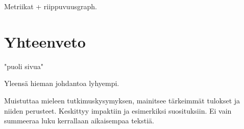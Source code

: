 \documentclass[finnish]{tktltiki2}
\theoremstyle{definition}
\theoremstyle{remark}
\begin{document}
Metriikat + riippuvuusgraph.

\section{Yhteenveto}
"puoli sivua"

Yleensä hieman johdantoa lyhyempi.

Muistuttaa mieleen tutkimuskysymyksen, mainitsee tärkeimmät tulokset ja niiden perusteet. Keskittyy impaktiin ja esimerkiksi suosituksiin. Ei vain summeeraa luku kerrallaan aikaisempaa tekstiä.



%
%
% 
%

%






% 
\end{document}

